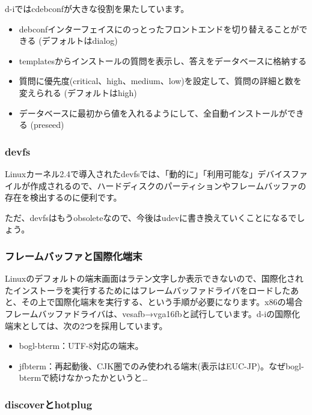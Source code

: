 \documentclass[mingoth]{jsarticle}
\begin{document}
d-iではcdebconfが大きな役割を果たしています。

\begin{itemize}
\item debconfインターフェイスにのっとったフロントエンドを切り替えることができる (デフォルトはdialog)
\item templatesからインストールの質問を表示し、答えをデータベースに格納する
\item 質問に優先度(critical、high、medium、low)を設定して、質問の詳細と数を変えられる (デフォルトはhigh)
\item データベースに最初から値を入れるようにして、全自動インストールができる (preseed)
\end{itemize}


\subsubsection{devfs}
\label{sec:devfs}

Linuxカーネル2.4で導入されたdevfsでは、「動的に」「利用可能な」デバイスファイルが作成されるので、ハードディスクのパーティションやフレームバッファの存在を検出するのに便利です。

ただ、devfsはもうobsoleteなので、今後はudevに書き換えていくことになるでしょう。


\subsubsection{フレームバッファと国際化端末}
\label{sec:i18n}

Linuxのデフォルトの端末画面はラテン文字しか表示できないので、国際化されたインストーラを実行するためにはフレームバッファドライバをロードしたあと、その上で国際化端末を実行する、という手順が必要になります。x86の場合フレームバッファドライバは、vesafb→vga16fbと試行しています。d-iの国際化端末としては、次の2つを採用しています。

\begin{itemize}
\item bogl-bterm：UTF-8対応の端末。
\item jfbterm：再起動後、CJK圏でのみ使われる端末(表示はEUC-JP)。なぜbogl-btermで続けなかったかというと…
\end{itemize}


\subsubsection{discoverとhotplug}
\label{sec:discover}
\end{document}
